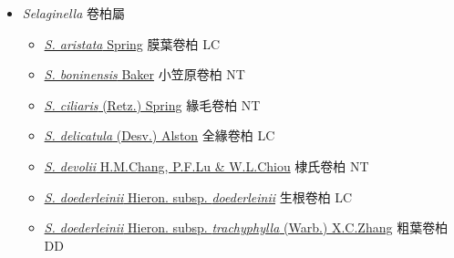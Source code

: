 
  \begin{itemize}
 \item[] \textit{Selaginella} 卷柏屬
                    
  \begin{itemize}
        \item[] \href{http://www.theplantlist.org/tpl1.1/search?q=Selaginella+aristata}{\textit{S. aristata} Spring}        膜葉卷柏 LC
        \item[] \href{http://www.theplantlist.org/tpl1.1/search?q=Selaginella+boninensis}{\textit{S. boninensis} Baker}   小笠原卷柏 NT
        \item[] \href{http://www.theplantlist.org/tpl1.1/search?q=Selaginella+ciliaris}{\textit{S. ciliaris} (Retz.) Spring}   緣毛卷柏 NT
        \item[] \href{http://www.theplantlist.org/tpl1.1/search?q=Selaginella+delicatula}{\textit{S. delicatula} (Desv.) Alston}   全緣卷柏 LC
        \item[] \href{http://www.theplantlist.org/tpl1.1/search?q=Selaginella+devolii}{\textit{S. devolii} H.M.Chang, P.F.Lu \& W.L.Chiou}   棣氏卷柏 NT
        \item[] \href{http://www.theplantlist.org/tpl1.1/search?q=Selaginella+doederleinii+subsp.+doederleinii}{\textit{S. doederleinii} Hieron. subsp. \textit{doederleinii}}   生根卷柏 LC
        \item[] \href{http://www.theplantlist.org/tpl1.1/search?q=Selaginella+doederleinii+subsp.+trachyphylla}{\textit{S. doederleinii} Hieron. subsp. \textit{trachyphylla} (Warb.) X.C.Zhang}   粗葉卷柏 DD

\end{itemize}
\end{itemize}

